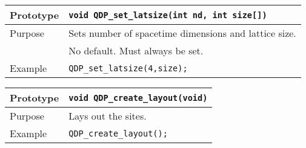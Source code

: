 \documentclass{article}
\begin{document}
\begin{flushleft}
  \begin{tabular}{|l|l|}
  \hline
  Prototype      & \verb|void QDP_set_latsize(int nd, int size[])|\\
    \hline
  Purpose        & Sets number of spacetime dimensions and lattice size. \\
                 & No default.  Must always be set. \\
\hline
  Example  & \verb|QDP_set_latsize(4,size);| \\
   \hline
 \end{tabular}
\end{flushleft}





\begin{flushleft}
  \begin{tabular}{|l|l|}
  \hline
  Prototype      & \verb|void QDP_create_layout(void)|\\
    \hline
  Purpose        & Lays out the sites. \\
\hline
  Example  & \verb|QDP_create_layout();| \\
   \hline
 \end{tabular}
\end{flushleft}
\end{document}
